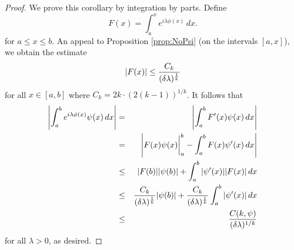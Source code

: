 \documentclass[11pt]{article}
\newcommand{\f}[2]{\frac{#1}{#2}}
\begin{document}
\begin{proof}
We prove this corollary by integration by parts. Define
\begin{equation*}
    F(x) = \int_a^x e^{i\lambda \phi(x)}\,dx.
\end{equation*}
for $a\leq x\leq b$. An appeal to Proposition \ref{prop:NoPsi} (on the intervals $[a,x]$), we obtain the estimate
\begin{equation*}
    \abs{F(x)} \leq \f{C_k}{(\delta\lambda)^{\f{1}{k}}}
\end{equation*}
for all $x\in [a,b]$ where $C_k=2k\cdot(2(k-1))^{1/k}$. It follows that 
\begin{eqnarray*}
     \abs{\int_a^b e^{i\lambda \phi(x)} \psi(x) \,dx} 
     &=& \abs{\int_a^b F'(x)\psi(x)\,dx}  \\
     &=& \abs{ F(x)\psi(x)\bigg\vert_{a}^b - \int_a^b F(x)\psi'(x)\,dx   } \\
     &\leq& \abs{F(b)}\abs{ \psi(b)} + \int_a^b \abs{\psi'(x)}\abs{ F(x)}\, dx  \\
     &\leq& \f{C_k}{(\delta\lambda)^{\f{1}{k}}}\abs{\psi(b)} + \f{C_k}{(\delta\lambda)^{\f{1}{k}}} \int_a^b \abs{\psi'(x)}\,dx\\
     &\leq& \frac{C(k,\psi)}{(\delta\lambda)^{1/k}}
\end{eqnarray*}
for all $\lambda>0$, as desired.
\end{proof}
\end{document}
